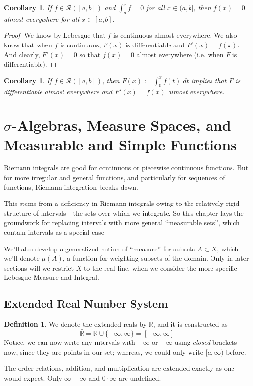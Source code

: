 \documentclass[12pt]{article}
\theoremstyle{plain}
\newtheorem{cor}[thm]{Corollary}
\theoremstyle{definition}
\newtheorem{defn}[thm]{Definition}
\theoremstyle{remark}
\begin{document}
\begin{cor}
If $f\in\mathscr{R}([a,b])$ and $\int^x_a f = 0$ for all $x\in(a,b]$, then $f(x)=0$ almost everywhere for all $x\in[a,b]$.
\end{cor}
\begin{proof}
We know by Lebesgue that $f$ is continuous almost everywhere. We also know that when $f$ is continuous, $F(x)$ is differentiable and $F'(x)=f(x)$. And clearly, $F'(x)=0$ so that $f(x)=0$ almost everywhere (i.e. when $F$ is differentiable).
\end{proof}

\begin{cor}
If $f\in\mathscr{R}([a,b])$, then $F(x):=\int^x_0 f(t) \; dt$ implies that $F$ is differentiable almost everywhere and $F'(x)=f(x)$ almost everywhere.
\end{cor}

\newpage
\section{$\sigma$-Algebras, Measure Spaces, and Measurable and Simple Functions}

Riemann integrals are good for continuous or piecewise continuous functions.  But for more irregular and general functions, and particularly for sequences of functions, Riemann integration breaks down.

This stems from a deficiency in Riemann integrals owing to the relatively rigid structure of intervals---the sets over which we integrate. So this chapter lays the groundwork for replacing intervals with more general ``measurable sets'', which contain intervals as a special case.

We'll also develop a generalized notion of ``measure'' for subsets $A\subset X$, which we'll denote $\mu(A)$, a function for weighting subsets of the domain. Only in later sections will we restrict $X$ to the real line, when we consider the more specific Lebesgue Measure and Integral.



\subsection{Extended Real Number System}

\begin{defn}
We denote the extended reals by $\bar{\mathbb{R}}$, and it is constructed as 
\[ 
    \bar{\mathbb{R}} = {\mathbb{R}} \cup \{-\infty, \infty\}
    = [-\infty,\infty]
\]
Notice, we can now write any intervals with $-\infty$ or $+\infty$ using \emph{closed} brackets now, since they are points in our set; whereas, we could only write $[a,\infty)$ before.

The order relations, addition, and multiplication are extended exactly as one would expect. Only $\infty-\infty$ and $0\cdot \infty$ are undefined.
\end{defn}
\end{document}
